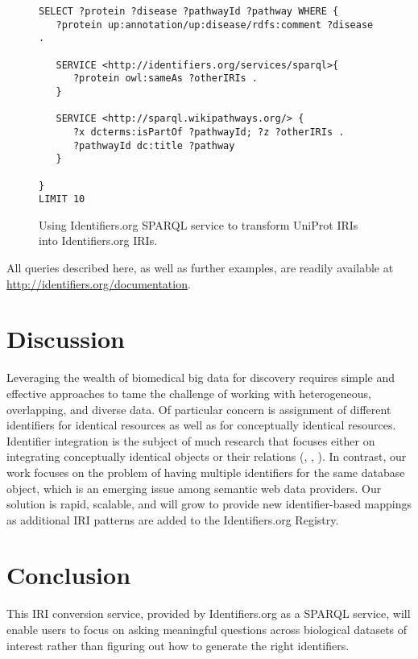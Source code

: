 \documentclass{bioinfo}
\begin{document}
\begin{figure}[h]
{\scriptsize
\begin{verbatim}		
SELECT ?protein ?disease ?pathwayId ?pathway WHERE {
   ?protein up:annotation/up:disease/rdfs:comment ?disease .
   
   SERVICE <http://identifiers.org/services/sparql>{
      ?protein owl:sameAs ?otherIRIs .
   }
   
   SERVICE <http://sparql.wikipathways.org/> {
      ?x dcterms:isPartOf ?pathwayId; ?z ?otherIRIs .
      ?pathwayId dc:title ?pathway
   }

}
LIMIT 10
\end{verbatim}
}
\caption{Using Identifiers.org SPARQL service to transform UniProt IRIs into Identifiers.org IRIs.}
\label{example2}
\end{figure}

All queries described here, as well as further examples, are readily available at \href{http://identifiers.org/documentation}{http://identifiers.org/documentation}.
    
\section{Discussion}
Leveraging the wealth of biomedical big data for discovery requires simple and effective approaches to tame the challenge of working with heterogeneous, overlapping, and diverse data. Of particular concern is assignment of different identifiers for identical resources as well as for conceptually identical resources. Identifier integration is the subject of much research that focuses either on integrating conceptually identical objects or their relations (\cite{VanIersel2010}, \cite{Wein2012}, \cite{Chambers2013}). In contrast, our work focuses on the problem of having multiple identifiers for the same database object, which is an emerging issue among semantic web data providers. Our solution is rapid, scalable, and will grow to provide new identifier-based mappings as additional IRI patterns are added to the Identifiers.org Registry.

\section{Conclusion}
This IRI conversion service, provided by Identifiers.org as a SPARQL service, will enable users to focus on asking meaningful questions across biological datasets of interest rather than figuring out how to generate the right identifiers.
\end{document}
